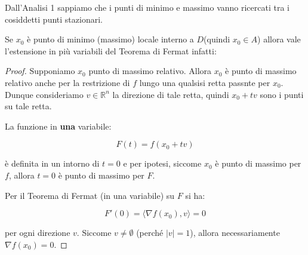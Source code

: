 \documentclass[../appunti-analisi.tex]{subfiles}
\begin{document}



Dall’Analisi 1 sappiamo che i punti di minimo e massimo vanno ricercati tra i cosiddetti punti stazionari.

Se $x_0$ è punto di minimo (massimo) locale interno a $D$(quindi $x_0 \in A$) allora vale l’estensione in più variabili del Teorema di Fermat infatti:



\begin{proof}
    Supponiamo $x_0$ punto di massimo relativo. Allora $x_0$ è punto di massimo relativo anche per la restrizione di $f$ lungo una qualsisi retta passnte per $x_0$. Dunque consideriamo $v \in \mathbb{R}^{n}$ la direzione di tale retta, quindi $x_0 + tv$ sono i punti su tale retta.

    La funzione in \textbf{una} variabile:

        \[
        F(t) = f(x_0 + tv)
    \] 

    è definita in un intorno di $t=0$ e per ipotesi, siccome $x_0$ è punto di massimo per $f$, allora $t=0$ è punto di massimo per $F$.

    Per il Teorema di Fermat (in una variabile) su $F$ si ha:

    \[
        F'(0) = \langle \nabla f(x_0),v \rangle = 0
    \]

    per ogni direzione $v$. Siccome $v \neq \emptyset$ (perché $|v| = 1$), allora necessariamente $\nabla f(x_0) = 0$.

\end{proof}


    
    

    
\end{document}
